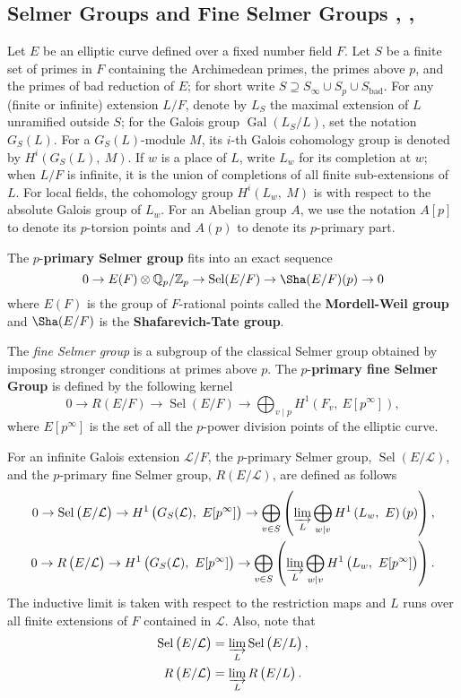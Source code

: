 \documentclass{amsart}
\DeclareMathOperator{\Gal}{Gal}
\DeclareMathOperator{\bad}{bad}
\DeclareMathOperator{\Sel}{Sel}
\newcommand{\QQ}{\mathbb Q}
\newcommand{\ZZ}{\mathbb Z}
\newcommand{\Linf}{\mathcal{L}}
\theoremstyle{definition}
\theoremstyle{remark}
\begin{document}
\subsection{Selmer Groups and Fine Selmer Groups \cite{CS00}, \cite{CS05}, \cite{Wut04_thesis}}
Let $E$ be an elliptic curve defined over a fixed number field $F$. 
Let $S$ be a finite set of primes in $F$ containing the Archimedean primes, the primes above $p$, and the primes of bad reduction of $E$; for short write $S\supseteq S_\infty\cup S_p \cup S_{\bad}$. 
For any (finite or infinite) extension $L/F$, denote by $L_S$ the maximal extension of $L$ unramified outside $S$; for the Galois group $\Gal(L_S/L)$, set the notation $G_S(L)$. 
For a $G_S(L)$-module $M$, its $i$-th Galois cohomology group is denoted by $H^i\left(G_S\left(L\right), \ M\right)$. 
If $w$ is a place of $L$, write $L_w$ for its completion at $w$; when $L/F$ is infinite, it is the union of completions of all finite sub-extensions of $L$. 
For local fields, the cohomology group $H^i\left(L_w, \ M\right)$ is with respect to the absolute Galois group of $L_w$. 
For an Abelian group $A$, we use the notation $A[p]$ to denote its $p$-torsion points and $A(p)$ to denote its $p$-primary part. 

The $p$-\textbf{primary Selmer group} fits into an exact sequence
\[
0\rightarrow E(F)\otimes \QQ_p/\ZZ_p \rightarrow \Sel(E/F) \rightarrow \Sha(E/F)(p) \rightarrow 0
\]
where $E(F)$ is the group of $F$-rational points called the \textbf{Mordell-Weil group} and $\Sha(E/F)$ is the \textbf{Shafarevich-Tate group}. 

The \textit{fine Selmer group} is a subgroup of the classical Selmer group obtained by imposing stronger conditions at primes above $p$.
The $p$-\textbf{primary fine Selmer Group} is defined by the following kernel
\[
0\rightarrow R\left(E/F\right) \rightarrow \Sel\left(E/F\right) \rightarrow \bigoplus_{v\mid p}H^1\left(F_v, \ E[p^\infty]\right),
\]
where $E[p^\infty]$ is the set of all the $p$-power division points of the elliptic curve.

For an infinite Galois extension $\Linf/F$, the $p$-primary Selmer group, $\Sel\left( E/\Linf\right)$, and the $p$-primary fine Selmer group, $R\left( E/\Linf\right)$, are defined as follows
\begin{align*}
0 \rightarrow \Sel\left( E/\Linf\right) \rightarrow H^1\left( G_S(\Linf), \ E[p^\infty]\right) \rightarrow \bigoplus_{v\in S} \left( \varinjlim_L \bigoplus_{w\mid v} H^1 \left( L_w, \ E \right)(p)\right),\\
0 \rightarrow R\left( E/\Linf\right) \rightarrow H^1\left( G_S(\Linf), \ E[p^\infty]\right) \rightarrow \bigoplus_{v\in S} \left( \varinjlim_L \bigoplus_{w\mid v} H^1 \left( L_w, \ E[p^\infty]\right)\right).
\end{align*}
The inductive limit is taken with respect to the restriction maps and $L$ runs over all finite extensions of $F$ contained in $\Linf$.
Also, note that
\begin{align*}
\Sel \left( E/\Linf\right) &= \varinjlim_L \Sel \left(E/L \right), \\
R\left( E/\Linf\right) &= \varinjlim_L R\left(E/L \right).
\end{align*}
\end{document}
